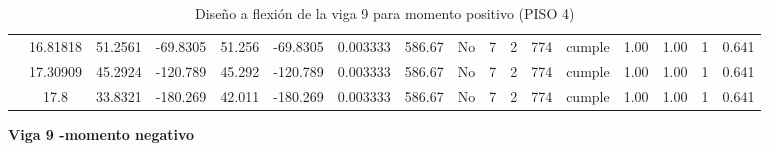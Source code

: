 \begin{table}[H]
{\begin{tabular}{|c|c|c|c|c|c|c|c|c|c|c|c|c|c|c|c|c|}
\cline{2-17}    & 16.81818 & 51.2561 & -69.8305 & 51.256 & -69.8305 & 0.003333 & 586.67 & No  & 7   & 2   & 774 & \cellcolor[rgb]{ .776,  .937,  .808}cumple & 1.00 & 1.00 & 1   & 0.641 \bigstrut\\
\cline{2-17}    & 17.30909 & 45.2924 & -120.789 & 45.292 & -120.789 & 0.003333 & 586.67 & No  & 7   & 2   & 774 & \cellcolor[rgb]{ .776,  .937,  .808}cumple & 1.00 & 1.00 & 1   & 0.641 \bigstrut\\
\cline{2-17}    & 17.8 & 33.8321 & -180.269 & 42.011 & -180.269 & 0.003333 & 586.67 & No  & 7   & 2   & 774 & \cellcolor[rgb]{ .776,  .937,  .808}cumple & 1.00 & 1.00 & 1   & 0.641 \bigstrut\\
\hline
\end{tabular}%


  

  }%
    \caption{Diseño a flexión de la viga 9 para momento positivo (PISO 4) }
  \label{tab:F VG9 P4 M+}%
\end{table}%
\newpage
\textbf{Viga 9 -momento negativo}
